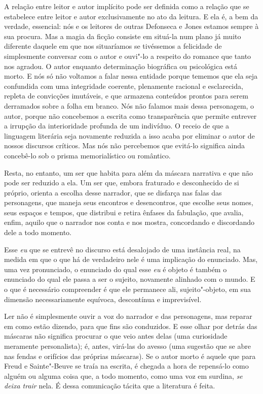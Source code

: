 A relação entre leitor e autor implícito pode ser definida como a
relação que se estabelece entre leitor e autor exclusivamente no ato da
leitura. E ela é, a bem da verdade, essencial: nós e os leitores de
outras Defonseca e Jones estamos sempre à sua procura. Mas a magia da
ficção consiste em situá-la num plano já muito diferente daquele em que
nos situaríamos se tivéssemos a felicidade de simplesmente conversar com
o autor e ouvi"-lo a respeito do romance que tanto nos agradou. O autor
enquanto determinação biográfica ou psicológica está morto. E nós só não
voltamos a falar nessa entidade porque tememos que ela seja confundida
com uma integridade coerente, plenamente racional e esclarecida, repleta
de convicções imutáveis, e que armazena conteúdos prontos para serem
derramados sobre a folha em branco. Nós não falamos mais dessa
personagem, o autor, porque não concebemos a escrita como transparência
que permite entrever a irrupção da interioridade profunda de um
indivíduo. O receio de que a linguagem literária seja novamente reduzida
a isso acaba por eliminar o autor de nossos discursos críticos. Mas nós
não percebemos que evitá-lo significa ainda concebê-lo sob o prisma
memorialístico ou romântico.

Resta, no entanto, um ser que habita para além da máscara narrativa e
que não pode ser reduzido a ela. Um ser que, embora fraturado e
desconhecido de si próprio, orienta a escolha desse narrador, que se
disfarça nas falas das personagens, que maneja seus encontros e
desencontros, que escolhe seus nomes, seus espaços e tempos, que
distribui e retira ênfases da fabulação, que avalia, enfim, aquilo que o
narrador nos conta e nos mostra, concordando e discordando dele a todo
momento.

Esse \emph{eu} que se entrevê no discurso está desalojado de uma
instância real, na medida em que o que há de verdadeiro nele é uma
implicação do enunciado. Mas, uma vez pronunciado, o enunciado do qual
esse \emph{eu} é objeto é também o enunciado do qual ele passa a ser o
sujeito, novamente alinhado com o mundo. E o que é necessário
compreender é que ele permanece ali, sujeito"-objeto, em sua dimensão
necessariamente equívoca, descontínua e imprevisível.

Ler não é simplesmente ouvir a voz do narrador e das personagens, mas
reparar em como estão dizendo, para que fins são conduzidos. E esse
olhar por detrás das máscaras não significa procurar o que veio antes
delas (uma curiosidade meramente personalista); é, antes, virá-las do
avesso (uma sugestão que se abre nas fendas e orifícios das próprias
máscaras). Se o autor morto é aquele que para Freud e Sainte"-Beuve se traía na escrita, é chegada a hora de repensá-lo como alguém ou alguma
coisa que, a todo momento, como uma voz em surdina, \emph{se deixa trair} nela. É dessa comunicação tácita que a literatura é feita.

